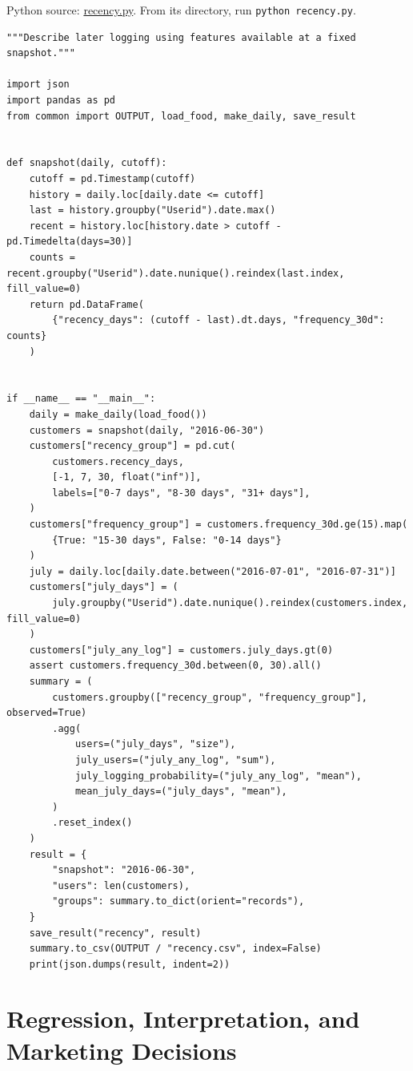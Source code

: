 \FloatBarrier
{}
Python source:
\href{../03_Data_and_Code/mHealth/recurring_examples/recency.py}{recency.py}.
From its directory, run \texttt{python\ recency.py}.

\begin{Verbatim}[breaklines,breakanywhere,fontsize=\small]
"""Describe later logging using features available at a fixed snapshot."""

import json
import pandas as pd
from common import OUTPUT, load_food, make_daily, save_result


def snapshot(daily, cutoff):
    cutoff = pd.Timestamp(cutoff)
    history = daily.loc[daily.date <= cutoff]
    last = history.groupby("Userid").date.max()
    recent = history.loc[history.date > cutoff - pd.Timedelta(days=30)]
    counts = recent.groupby("Userid").date.nunique().reindex(last.index, fill_value=0)
    return pd.DataFrame(
        {"recency_days": (cutoff - last).dt.days, "frequency_30d": counts}
    )


if __name__ == "__main__":
    daily = make_daily(load_food())
    customers = snapshot(daily, "2016-06-30")
    customers["recency_group"] = pd.cut(
        customers.recency_days,
        [-1, 7, 30, float("inf")],
        labels=["0-7 days", "8-30 days", "31+ days"],
    )
    customers["frequency_group"] = customers.frequency_30d.ge(15).map(
        {True: "15-30 days", False: "0-14 days"}
    )
    july = daily.loc[daily.date.between("2016-07-01", "2016-07-31")]
    customers["july_days"] = (
        july.groupby("Userid").date.nunique().reindex(customers.index, fill_value=0)
    )
    customers["july_any_log"] = customers.july_days.gt(0)
    assert customers.frequency_30d.between(0, 30).all()
    summary = (
        customers.groupby(["recency_group", "frequency_group"], observed=True)
        .agg(
            users=("july_days", "size"),
            july_users=("july_any_log", "sum"),
            july_logging_probability=("july_any_log", "mean"),
            mean_july_days=("july_days", "mean"),
        )
        .reset_index()
    )
    result = {
        "snapshot": "2016-06-30",
        "users": len(customers),
        "groups": summary.to_dict(orient="records"),
    }
    save_result("recency", result)
    summary.to_csv(OUTPUT / "recency.csv", index=False)
    print(json.dumps(result, indent=2))
\end{Verbatim}

\hypertarget{M03-m3.-regression-interpretation-and-marketing-decisions}{%
\chapter{Regression, Interpretation, and Marketing
Decisions}\label{M03-m3.-regression-interpretation-and-marketing-decisions}}

